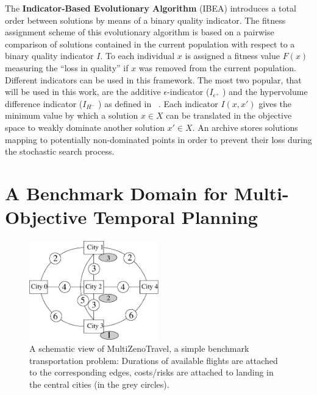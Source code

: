 \documentclass{llncs}
\def\MULTIZENO{{\sc MultiZenoTravel}}
\begin{document}
The {\bf Indicator-Based Evolutionary Algorithm} (IBEA) \cite{Zitzler2004}
introduces a total order between solutions by means of a binary quality indicator. 
The fitness assignment scheme of this evolutionary algorithm is based on a pairwise comparison of solutions contained 
in  the current population with respect to a binary quality indicator $I$. To each individual $x$ is assigned a fitness value $F (x)$ measuring the ``loss in quality'' if $x$ was removed from the current
population. Different indicators can be used in this framework. The most two popular, that will be used in this work, are the additive $\epsilon$-indicator ($I_{\epsilon^+}$ ) and the hypervolume
difference indicator ($I_{H^-}$ )  as defined in ~\cite{Zitzler2004}. 
Each indicator  $I (x, x')$ gives the minimum value by which a solution $x \in X$  can be translated in the objective space to weakly dominate
another solution $x' \in X$. 
An archive stores solutions mapping to potentially non-dominated points in order to prevent their loss during the stochastic search process.


\section{A Benchmark Domain for Multi-Objective Temporal Planning}
\label{benchmark}

\begin{figure}[tb!]
\begin{center}
 \includegraphics[width=0.5\textwidth]{./miniMulti.eps}
\caption{A schematic view of \MULTIZENO, a simple benchmark transportation problem: Durations of available flights are attached to the corresponding edges, costs/risks are attached to landing in the central cities (in the grey circles).}
\label{fig.instance}
\end{center}
\end{figure}
\end{document}
